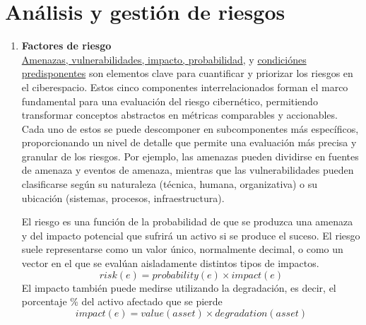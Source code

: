 \section{Análisis y gestión de riesgos}
\begin{enumerate}[resume]

\item \textbf{Factores de riesgo} \\
\ul{Amenazas, vulnerabilidades, impacto, probabilidad}, y \ul{condiciónes predisponentes} son elementos clave para cuantificar y priorizar los riesgos en el ciberespacio. 
Estos cinco componentes interrelacionados forman el marco fundamental para una evaluación del riesgo cibernético, permitiendo transformar conceptos abstractos en métricas comparables y accionables. \\
Cada uno de estos se puede descomponer en subcomponentes más específicos, proporcionando un nivel de detalle que permite una evaluación más precisa y granular de los riesgos. Por ejemplo, las amenazas pueden dividirse en fuentes de amenaza y eventos de amenaza, mientras que las vulnerabilidades pueden clasificarse según su naturaleza (técnica, humana, organizativa) o su ubicación (sistemas, procesos, infraestructura).
\nl

El riesgo es una función de la probabilidad de que se produzca una amenaza y del impacto potencial que sufrirá un activo si se produce el suceso.
El riesgo suele representarse como un valor único, normalmente decimal, o como un vector en el que se evalúan aisladamente distintos tipos de impactos.
\[
risk(e) = probability(e) \times impact(e)
\]
El impacto también puede medirse utilizando la degradación, es decir, el porcentaje \% del activo afectado que se pierde
\[
   impact(e) = value(asset) \times degradation(asset)
\]



\end{enumerate}
